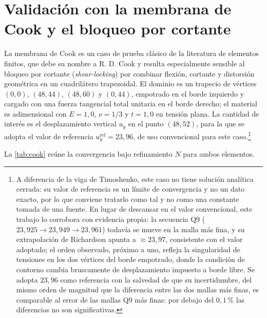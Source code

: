 \section{Validación con la membrana de Cook y el bloqueo por cortante}
\label{sec:cook}

La membrana de Cook es un caso de prueba clásico de la literatura de elementos finitos, que debe su nombre a R. D. Cook y resulta especialmente sensible al bloqueo por cortante (\emph{shear-locking}) por combinar flexión, cortante y distorsión geométrica en un cuadrilátero trapezoidal. El dominio es un trapecio de vértices $(0,0)$, $(48,44)$, $(48,60)$ y $(0,44)$, empotrado en el borde izquierdo y cargado con una fuerza tangencial total unitaria en el borde derecho; el material es adimensional con $E = 1{,}0$, $\nu = 1/3$ y $t = 1{,}0$ en tensión plana. La cantidad de interés es el desplazamiento vertical $u_y$ en el punto $(48,52)$, para la que se adopta el valor de referencia $u_y^{\text{ref}} = 23{,}96$, de uso convencional para este caso.\footnote{A diferencia de la viga de Timoshenko, este caso no tiene solución analítica cerrada: su valor de referencia es un límite de convergencia y no un dato exacto, por lo que conviene tratarlo como tal y no como una constante tomada de una fuente. En lugar de descansar en el valor convencional, este trabajo lo corrobora con evidencia propia: la secuencia Q9 ($23{,}925 \to 23{,}949 \to 23{,}961$) todavía se mueve en la malla más fina, y su extrapolación de Richardson \autocite[pp.~309-312]{oberkampf2010vv} apunta a $\approx 23{,}97$, consistente con el valor adoptado; el orden observado, próximo a uno, refleja la singularidad de tensiones en los dos vértices del borde empotrado, donde la condición de contorno cambia bruscamente de desplazamiento impuesto a borde libre. Se adopta $23{,}96$ como referencia con la salvedad de que su incertidumbre, del mismo orden de magnitud que la diferencia entre las dos mallas más finas, es comparable al error de las mallas Q9 más finas: por debajo del $0{,}1\,\%$ las diferencias no son significativas.}

La \autoref{tab:cook} reúne la convergencia bajo refinamiento $N$ para ambos elementos.

